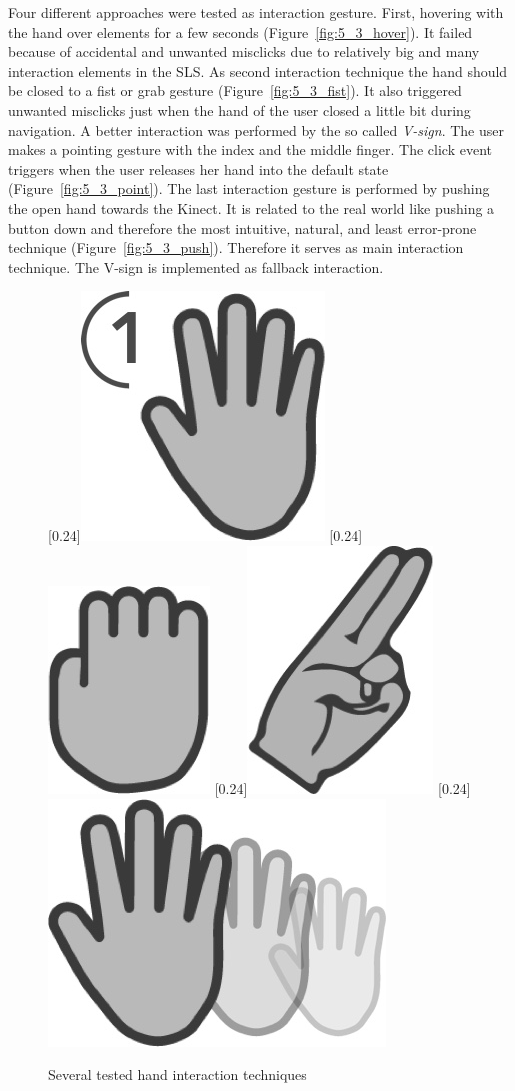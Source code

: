 Four different approaches were tested as interaction gesture. First, hovering with the hand over elements for a few seconds (Figure~\ref{fig:5_3_hover}). It failed because of accidental and unwanted misclicks due to relatively big and many interaction elements in the SLS.
As second interaction technique the hand should be closed to a fist or grab gesture (Figure~\ref{fig:5_3_fist}). It also triggered unwanted misclicks just when the hand of the user closed a little bit during navigation.
A better interaction was performed by the so called \textit{V-sign}. The user makes a pointing gesture with the index and the middle finger. The click event triggers when the user releases her hand into the default state (Figure~\ref{fig:5_3_point}). The last interaction gesture is performed by pushing the open hand towards the Kinect. It is related to the real world like pushing a button down and therefore the most intuitive, natural, and least error-prone technique (Figure~\ref{fig:5_3_push}). %
Therefore it serves as main interaction technique. The V-sign is implemented as fallback interaction.
\begin{figure}[htb]
	\centering
		[0.24\linewidth]{\includegraphics[width=0.12\linewidth]{Pictures/5_3_hover}}
		[0.24\linewidth]{\includegraphics[width=0.08\linewidth]{Pictures/5_3_fist}}
		[0.24\linewidth]{\includegraphics[width=0.097\linewidth]{Pictures/5_3_point}}
		[0.24\linewidth]{\includegraphics[width=0.176\linewidth]{Pictures/5_3_push2}}
	\caption{Several tested hand interaction techniques}%
	\label{fig:5_3_handInteraction}
\end{figure}

